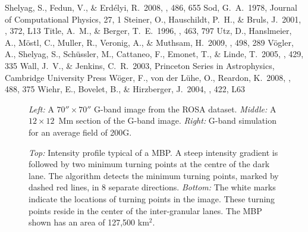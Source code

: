 \documentclass{emulateapj}
\begin{document}
\begin{thebibliography}{}
Shelyag, S., Fedun, V., \& Erd{\'e}lyi, R.\ 2008, \aap, 486, 655 
Sod, G.~A.\ 1978, Journal of Computational Physics, 27, 1 
Steiner, O., Hauschildt, P.~H., \& Bruls, J.\ 2001, \aap, 372, L13 
Title, A.~M., \& Berger, T.~E.\ 1996, \apj, 463, 797
Utz, D., Hanslmeier, A., M{\"o}stl, C., Muller, R., Veronig, A., \& Muthsam, H.\ 2009, \aap, 498, 289 
 V{\"o}gler, A., Shelyag, S., Sch{\"u}ssler, M., Cattaneo, F., Emonet, T., \& Linde, T.\ 2005, \aap, 429, 335 
Wall, J.~V., \& Jenkins, C.~R.\ 2003, Princeton Series in Astrophysics, Cambridge University Press
W{\"o}ger, F., von der L{\"u}he, O., Reardon, K.\ 2008, \aap, 488, 375
Wiehr, E., Bovelet, B., \& Hirzberger, J.\ 2004, \aap, 422, L63 
\end{thebibliography}

\newpage

\begin{figure}
\caption{{\it{Left:}} A $70'' \times 70''$ G-band image from the ROSA dataset. {\it{Middle:}} A $12 \times 12$~Mm section of the G-band image. {\it{Right:}} G-band simulation for an average field of 200G.
\label{f1}}
\end{figure}

\clearpage

\begin{figure}
\caption{{\it{Top:}} Intensity profile typical of a MBP. A steep intensity gradient is followed by two minimum turning points at the centre of the dark lane. The algorithm detects the minimum turning points, marked by dashed red lines, in 8 separate directions. {\it{Bottom:}} The white marks indicate the locations of turning points in the image. These turning points reside in the center of the inter-granular lanes. The MBP shown has an area of 127,500 km$^{2}$.
\label{f2}}
\end{figure} 
\end{document}
